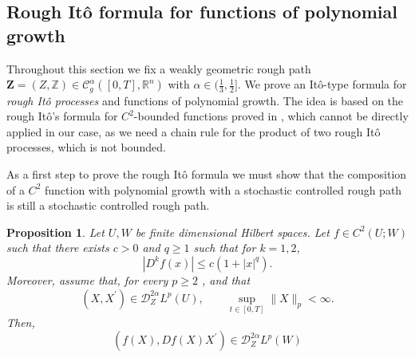 \documentclass[11pt,a4paper]{article}
\newcommand{\R}{\mathbb{R}}
\theoremstyle{plain}
\newtheorem{prop}[defn]{Proposition}
\begin{document}
\subsection{Rough It\^o formula for functions of polynomial growth}

Throughout this section we fix a weakly geometric rough path $\mathbf{Z} = (Z, \mathbb{Z})\in \mathscr{C}^{\alpha}_g([0,T],\R^n)$ with $\alpha \in (\frac{1}{3},\frac{1}{2}]$. 
We prove an It\^o-type formula for \textit{rough It\^o processes} and functions of polynomial growth. The idea is based on the rough It\^o's formula for $C^2$-bounded functions proved in \cite[Section 4.4]{FHL21}, which cannot be directly applied in our case, as we need a chain rule for the product of two rough It\^o processes, which is not bounded. 


As a first step to prove the rough It\^o formula we must show that the composition of a $C^2$ function with polynomial growth with a stochastic controlled rough path is still a stochastic controlled rough path.
\begin{prop}
\label{pro: chain rule C3 function}
    Let $U,W$ be finite dimensional Hilbert spaces. Let $f\in C^2(U;W)$ such that there exists $c>0$ and $q\geq 1$ such that for $k=1,2$,
    \begin{equation*}
        |D^kf(x)| \leq c (1+|x|^q).
    \end{equation*}
    Moreover, assume that, for every $p\geq 2$ ,  and that
    \begin{equation*}
    \label{eq: X stoch controlled and bounded}
        (X,X^{\prime})\in \mathscr{D}^{2\alpha}_{Z}L^p(U), \qquad
        \sup_{t\in[0,T]}\|X\|_{p} < \infty.
    \end{equation*}
    Then,
    \begin{equation*}
        (f(X), Df(X)X^{\prime}) \in \mathscr{D}^{2\alpha}_{Z}L^p(W)
    \end{equation*}
\end{prop}
\end{document}
